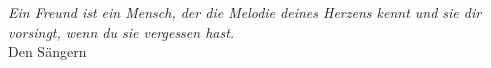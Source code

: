 \thispagestyle{empty}
\begin{center}
 \emph{Ein Freund ist ein Mensch, der die Melodie deines Herzens kennt und sie
       dir vorsingt, wenn du sie vergessen hast.}\\
 Den Sängern
\end{center}

\cleardoublepage
